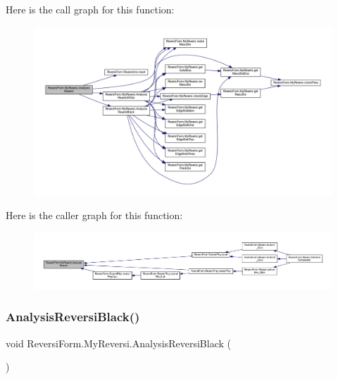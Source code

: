 Here is the call graph for this function\+:\nopagebreak
\begin{figure}[H]
\begin{center}
\leavevmode
\includegraphics[width=350pt]{class_reversi_form_1_1_my_reversi_afc9513cbba4f973c7d1ee92e0a0f3288_cgraph}
\end{center}
\end{figure}
Here is the caller graph for this function\+:\nopagebreak
\begin{figure}[H]
\begin{center}
\leavevmode
\includegraphics[width=350pt]{class_reversi_form_1_1_my_reversi_afc9513cbba4f973c7d1ee92e0a0f3288_icgraph}
\end{center}
\end{figure}
\mbox{\label{class_reversi_form_1_1_my_reversi_adfa9fda128ee816da9b32009326c5a15}} 
\subsubsection{\texorpdfstring{Analysis\+Reversi\+Black()}{AnalysisReversiBlack()}}
{\footnotesize\ttfamily void Reversi\+Form.\+My\+Reversi.\+Analysis\+Reversi\+Black (\begin{DoxyParamCaption}{ }\end{DoxyParamCaption})\hspace{0.3cm}{\ttfamily [private]}}



